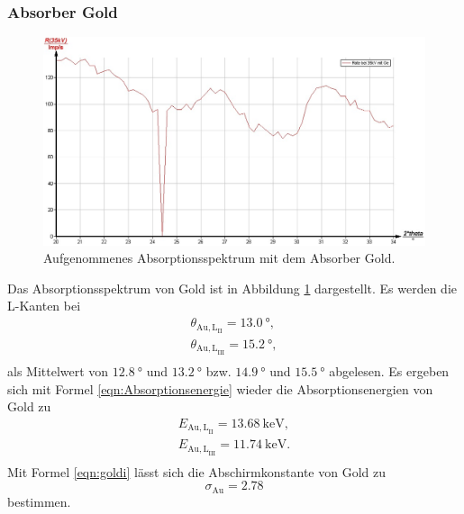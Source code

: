\subsubsection{Absorber Gold}
\begin{figure}
	\centering
	\includegraphics[width=1.0\textwidth]{nIKO_und_jULIAN_ÜLADS/gold.jpg}
	\caption{Aufgenommenes Absorptionsspektrum mit dem Absorber Gold.}
	\label{fig:gold_absorber}
\end{figure}
Das Absorptionsspektrum von Gold ist in Abbildung \ref{fig:gold_absorber} dargestellt.
Es werden die L-Kanten bei
\begin{gather*}
	\theta_{\mathrm{Au,L}_{\mathrm{II}}} = \SI{13,0}{\degree} \mathrm{,} \\
	\theta_{\mathrm{Au,L}_{\mathrm{III}}} = \SI{15,2}{\degree} \mathrm{,} \\
\end{gather*}
als Mittelwert von $\SI{12,8}{\degree}$ und $\SI{13,2}{\degree}$ bzw. $\SI{14,9}{\degree}$
und $\SI{15,5}{\degree}$ abgelesen.
Es ergeben sich mit Formel \eqref{eqn:Absorptionsenergie} wieder die Absorptionsenergien von
Gold zu
\begin{gather*}
	E_{\mathrm{Au,L}_{\mathrm{II}}} = \SI{13,68}{\kilo\electronvolt} \mathrm{,} \\
	E_{\mathrm{Au,L}_{\mathrm{III}}} = \SI{11,74}{\kilo\electronvolt} \mathrm{.} \\
\end{gather*}
Mit Formel \eqref{eqn:goldi} lässt sich die Abschirmkonstante von Gold zu
\begin{equation*}
	\sigma_{\mathrm{Au}} = \num{2,78}
\end{equation*}
bestimmen.

